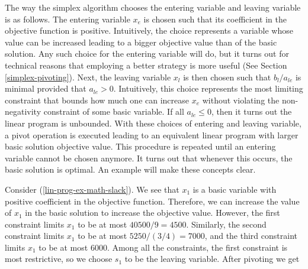 \documentclass{article}
\begin{document}
The way the simplex algorithm chooses the entering variable and leaving variable is as follows. The entering variable $x_e$ is chosen such that its coefficient in the objective function is positive. Intuitively, the choice represents a variable whose value can be increased leading to a bigger objective value than of the basic solution. Any such choice for the entering variable will do, but it turns out for technical reasons that employing a better strategy is more useful (See Section \ref{simplex-pivoting}). Next, the leaving variable $x_l$ is then chosen such that $b_l / a_{le}$ is minimal provided that $a_{le} > 0$. Intuitively, this choice represents the most limiting constraint that bounds how much one can increase $x_e$ without violating the non-negativity constraint of some basic variable. If all $a_{le} \leq 0$, then it turns out the linear program is unbounded. With these choices of entering and leaving variable, a pivot operation is executed leading to an equivalent linear program with larger basic solution objective value. This procedure is repeated until an entering variable cannot be chosen anymore. It turns out that whenever this occurs, the basic solution is optimal. An example will make these concepts clear.

Consider (\ref{lin-prog-ex-math-slack}). We see that $x_1$ is a basic variable with positive coefficient in the objective function. Therefore, we can increase the value of $x_1$ in the basic solution to increase the objective value. However, the first constraint limits $x_1$ to be at most $40500 / 9 = 4500$. Similarly, the second constraint limits $x_1$ to be at most $5250 / (3/4) = 7000$, and the third constraint limits $x_1$ to be at most $6000$. Among all the constraints, the first constraint is most restrictive, so we choose $s_1$ to be the leaving variable. After pivoting we get
\end{document}
